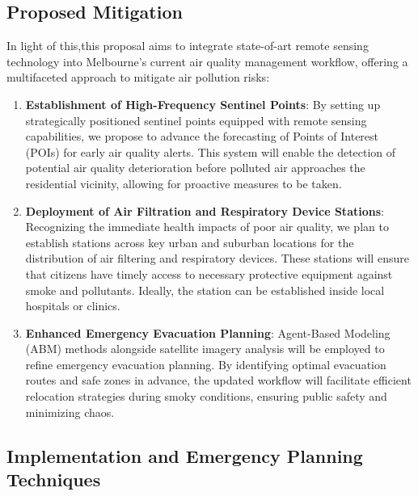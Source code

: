 \documentclass[
  letterpaper,
  DIV=11,
  numbers=noendperiod]{scrreprt}
\begin{document}
\hypertarget{proposed-mitigation}{%
\subsection*{Proposed Mitigation}\label{proposed-mitigation}}

In light of this,this proposal aims to integrate state-of-art remote
sensing technology into Melbourne's current air quality management
workflow, offering a multifaceted approach to mitigate air pollution
risks:

\begin{enumerate}
\def\labelenumi{\arabic{enumi}.}
\item
  \textbf{Establishment of High-Frequency Sentinel Points}: By setting
  up strategically positioned sentinel points equipped with remote
  sensing capabilities, we propose to advance the forecasting of Points
  of Interest (POIs) for early air quality alerts. This system will
  enable the detection of potential air quality deterioration before
  polluted air approaches the residential vicinity, allowing for
  proactive measures to be taken.
\item
  \textbf{Deployment of Air Filtration and Respiratory Device Stations}:
  Recognizing the immediate health impacts of poor air quality, we plan
  to establish stations across key urban and suburban locations for the
  distribution of air filtering and respiratory devices. These stations
  will ensure that citizens have timely access to necessary protective
  equipment against smoke and pollutants. Ideally, the station can be
  established inside local hospitals or clinics.
\item
  \textbf{Enhanced Emergency Evacuation Planning}: Agent-Based Modeling
  (ABM) methods alongside satellite imagery analysis will be employed to
  refine emergency evacuation planning. By identifying optimal
  evacuation routes and safe zones in advance, the updated workflow will
  facilitate efficient relocation strategies during smoky conditions,
  ensuring public safety and minimizing chaos.
\end{enumerate}

\hypertarget{implementation-and-emergency-planning-techniques}{%
\subsection*{Implementation and Emergency Planning
Techniques}\label{implementation-and-emergency-planning-techniques}}
\end{document}
